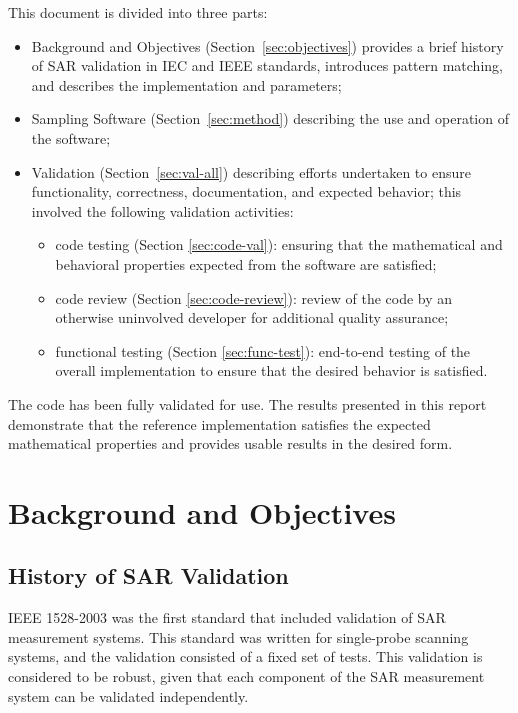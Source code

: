 \documentclass{./class/itisreport}
\begin{document}
This document is divided into three parts:

\begin{itemize}
\item Background and Objectives (Section~\ref{sec:objectives}) provides a brief history of SAR validation in IEC and IEEE standards, introduces pattern matching, and describes the implementation and parameters;
\item Sampling Software (Section~\ref{sec:method}) describing the use and operation of the software;
\item Validation (Section~\ref{sec:val-all}) describing efforts undertaken to ensure functionality, correctness, documentation, and expected behavior; this involved the following validation activities:
\begin{itemize}
\item code testing (Section \ref{sec:code-val}): ensuring that the mathematical and behavioral properties expected from the software are satisfied;
\item code review (Section \ref{sec:code-review}): review of the code by an otherwise uninvolved developer for additional quality assurance;
\item functional testing (Section \ref{sec:func-test}): end-to-end testing of the overall implementation to ensure that the desired behavior is satisfied.
\end{itemize}
\end{itemize}

The code has been fully validated for use. The results presented in this report demonstrate that the reference implementation satisfies the expected mathematical properties and provides usable results in the desired form.

\tableofcontents

\clearpage
\FloatBarrier
\section{Background and Objectives \label{sec:objectives}}


\subsection{History of SAR Validation} \label{sec:history}

IEEE 1528-2003 was the first standard that included validation of SAR measurement systems. This standard was written for single-probe scanning systems, and the validation consisted of a fixed set of tests. This validation is considered to be robust, given that each component of the SAR measurement system can be validated independently.
\end{document}
